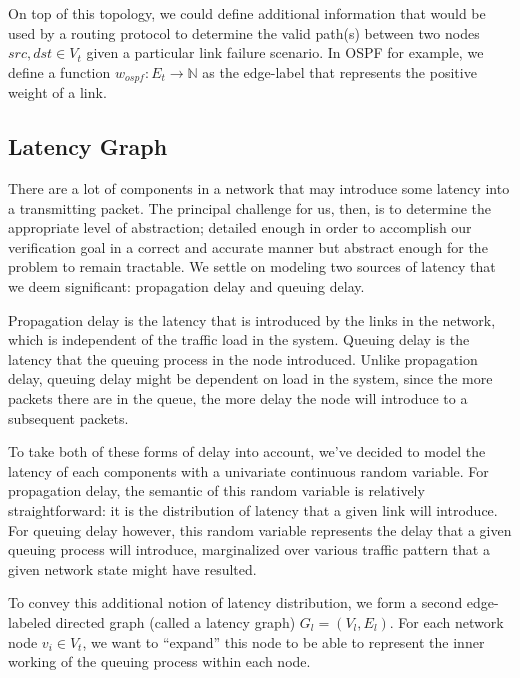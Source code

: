 \documentclass[10pt,sigconf,letterpaper,anonymous,nonacm]{acmart}
\begin{document}
On top of this topology, we could define additional information that would be used
by a routing protocol to determine the valid path(s) between two nodes 
$src, dst \in V_t$ given a particular link failure scenario. 
In OSPF for example, we define a function $w_{ospf}: E_t \rightarrow \mathbb{N}$ as the edge-label 
that represents the positive weight of a link.

\subsection{Latency Graph}
There are a lot of components in a network that may introduce some latency into 
a transmitting packet. 
The principal challenge for us, then, is to determine the appropriate level of abstraction; 
detailed enough in order to accomplish our verification goal in a correct and accurate manner but 
abstract enough for the problem to remain tractable. 
We settle on modeling two sources of latency that we deem significant: propagation delay and 
queuing delay.

Propagation delay is the latency that is introduced by the links in the network, which is 
independent of the traffic load in the system.
Queuing delay is the latency that the queuing process in the node introduced. 
Unlike propagation delay, queuing delay might be dependent on load in the system, since the more 
packets there are in the queue, the more delay the node will introduce to a subsequent packets.

To take both of these forms of delay into account, we've decided to model the latency of each
components with a univariate continuous random variable.
For propagation delay, the semantic of this random variable is relatively straightforward: it is 
the distribution of latency that a given link will introduce.
For queuing delay however, this random variable represents the delay that a given queuing process 
will introduce, marginalized over various traffic pattern that a given network state might have 
resulted.

To convey this additional notion of latency distribution, we form a second edge-labeled directed 
graph (called a latency graph) $G_l = (V_l, E_l)$.
For each network node $v_i \in V_t$, we want to ``expand'' this node to be able to represent the 
inner working of the queuing process within each node. 
\end{document}
